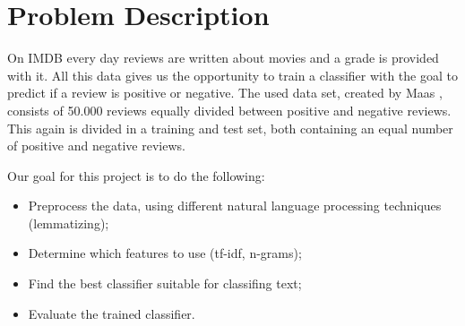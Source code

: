 \section{Problem Description}

On IMDB every day reviews are written about movies and a grade is provided with it.
All this data gives us the opportunity to train a classifier with the goal to predict if a review is positive or negative.
The used data set, created by Maas \etal \cite{Maas:2011}, consists of 50.000 reviews equally divided between positive and negative reviews. 
This again is divided in a training and test set, both containing an equal number of positive and negative reviews.

Our goal for this project is to do the following:
\begin{itemize}
\item Preprocess the data, using different natural language processing techniques (\eg lemmatizing);
\item Determine which features to use (\eg tf-idf, n-grams);
\item Find the best classifier suitable for classifing text;
\item Evaluate the trained classifier.
\end{itemize}